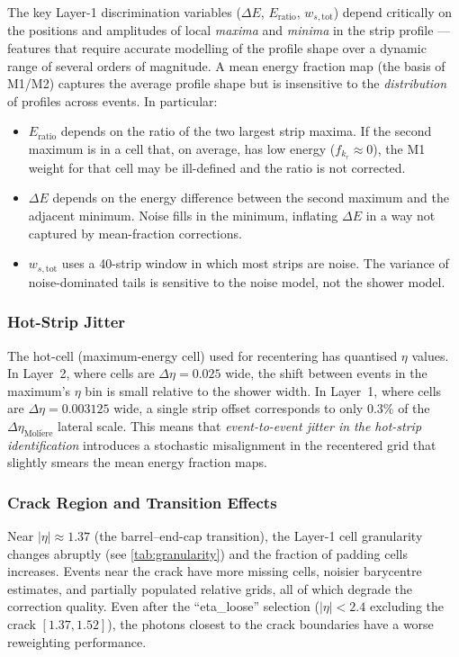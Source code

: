\documentclass[11pt,a4paper]{article}
\newcommand{\wstot}{w_{s,\mathrm{tot}}}
\newcommand{\dE}{\Delta E}
\newcommand{\Eratio}{E_{\mathrm{ratio}}}
\newcommand{\abseta}{|\eta|}
\begin{document}
The key Layer-1 discrimination variables ($\dE$, $\Eratio$, $\wstot$)
depend critically on the positions and amplitudes of local
\emph{maxima} and \emph{minima} in the strip profile — features that
require accurate modelling of the profile shape over a dynamic range
of several orders of magnitude.  A mean energy fraction map (the
basis of M1/M2) captures the average profile shape but is insensitive
to the \emph{distribution} of profiles across events.  In particular:
\begin{itemize}
  \item $\Eratio$ depends on the ratio of the two largest strip maxima.
        If the second maximum is in a cell that, on average, has low
        energy ($f_{k_r} \approx 0$), the M1 weight for that cell may be
        ill-defined and the ratio is not corrected.
  \item $\dE$ depends on the energy difference between the second
        maximum and the adjacent minimum.  Noise fills in the minimum,
        inflating $\dE$ in a way not captured by mean-fraction corrections.
  \item $\wstot$ uses a 40-strip window in which most strips are noise.
        The variance of noise-dominated tails is sensitive to the noise
        model, not the shower model.
\end{itemize}

\subsubsection{Hot-Strip Jitter}

The hot-cell (maximum-energy cell) used for recentering has
quantised $\eta$ values.  In Layer~2, where cells are
$\Delta\eta = 0.025$ wide, the shift between events in the
maximum's $\eta$ bin is small relative to the shower width.
In Layer~1, where cells are $\Delta\eta = 0.003125$ wide, a single
strip offset corresponds to only $0.3\%$ of the $\Delta\eta_{\mathrm{Moli\grave{e}re}}$
lateral scale.  This means that \emph{event-to-event jitter in the
hot-strip identification} introduces a stochastic misalignment in the
recentered grid that slightly smears the mean energy fraction maps.

\subsubsection{Crack Region and Transition Effects}

Near $\abseta \approx 1.37$ (the barrel--end-cap transition), the
Layer-1 cell granularity changes abruptly (see \cref{tab:granularity})
and the fraction of padding cells increases.  Events near the crack
have more missing cells, noisier barycentre estimates, and partially
populated relative grids, all of which degrade the correction quality.
Even after the ``eta\_loose'' selection ($\abseta < 2.4$ excluding
the crack $[1.37, 1.52]$), the photons closest to the crack
boundaries have a worse reweighting performance.
\end{document}
